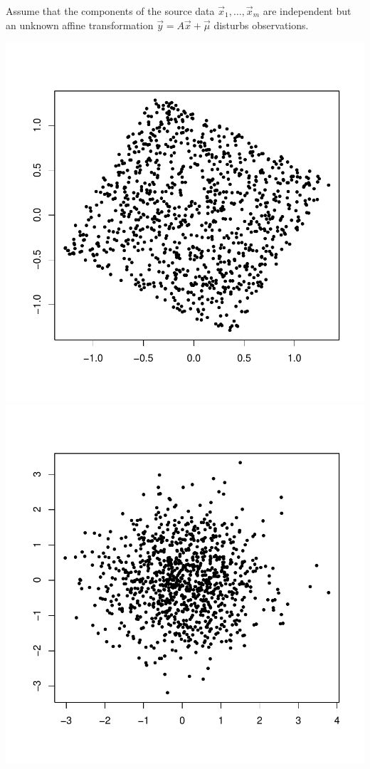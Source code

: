 \documentclass[landscape,footrule]{foils}
\begin{document}
Assume that the components of the source data $\vec{x}_1,\ldots,\vec{x}_m$ are independent  
but an unknown affine transformation  $\vec{y}=A\vec{x}+\vec{\mu}$ disturbs observations. 
\begin{center}
\includegraphics[scale=0.45]{ica-i.pdf}
\includegraphics[scale=0.45]{ica-ii.pdf}

\end{center}
\end{document}
